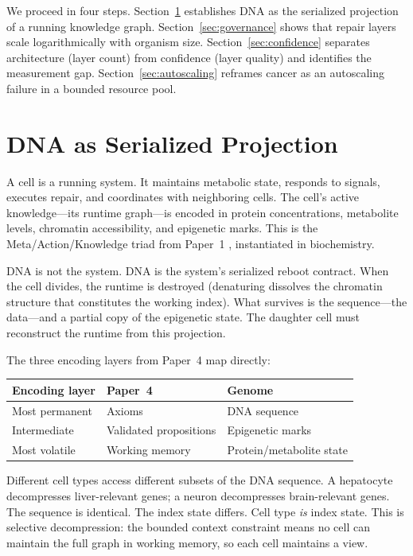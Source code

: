 \documentclass[11pt]{article}
\theoremstyle{definition}
\begin{document}
We proceed in four steps. Section~\ref{sec:projection} establishes
DNA as the serialized projection of a running knowledge graph.
Section~\ref{sec:governance} shows that repair layers scale
logarithmically with organism size. Section~\ref{sec:confidence}
separates architecture (layer count) from confidence (layer quality)
and identifies the measurement gap. Section~\ref{sec:autoscaling}
reframes cancer as an autoscaling failure in a bounded resource pool.

\section{DNA as Serialized Projection}
\label{sec:projection}

A cell is a running system. It maintains metabolic state, responds to
signals, executes repair, and coordinates with neighboring cells. The
cell's active knowledge---its runtime graph---is encoded in protein
concentrations, metabolite levels, chromatin accessibility, and
epigenetic marks. This is the Meta/Action/Knowledge triad from
Paper~1 \cite{McCarthy2026a}, instantiated in biochemistry.

DNA is not the system. DNA is the system's serialized reboot contract.
When the cell divides, the runtime is destroyed (denaturing dissolves
the chromatin structure that constitutes the working index). What
survives is the sequence---the data---and a partial copy of the
epigenetic state. The daughter cell must reconstruct the runtime from
this projection.

The three encoding layers from Paper~4 \cite{McCarthy2026d} map
directly:

\begin{center}
\begin{tabular}{lll}
\toprule
\textbf{Encoding layer} & \textbf{Paper~4} & \textbf{Genome} \\
\midrule
Most permanent & Axioms & DNA sequence \\
Intermediate & Validated propositions & Epigenetic marks \\
Most volatile & Working memory & Protein/metabolite state \\
\bottomrule
\end{tabular}
\end{center}

Different cell types access different subsets of the DNA sequence. A
hepatocyte decompresses liver-relevant genes; a neuron decompresses
brain-relevant genes. The sequence is identical. The index state
differs. Cell type \emph{is} index state. This is selective
decompression: the bounded context constraint means no cell can
maintain the full graph in working memory, so each cell maintains a
view.
\end{document}
